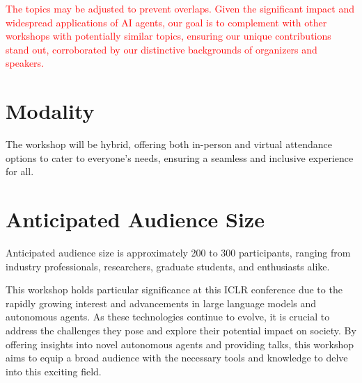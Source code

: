 \documentclass[10pt]{article} %
\begin{document}
\textcolor{red}{The topics may be adjusted to prevent overlaps. Given the significant impact and widespread applications of AI agents, our goal is to complement with other workshops with potentially similar topics, ensuring our unique contributions stand out, corroborated by our distinctive backgrounds of organizers and speakers.}

\section{Modality}
The workshop will be hybrid, offering both in-person and virtual attendance options to cater to everyone's needs, ensuring a seamless and inclusive experience for all.

\section{Anticipated Audience Size}
Anticipated audience size is approximately 200 to 300 participants, ranging from industry professionals, researchers, graduate students, and enthusiasts alike. 

This workshop holds particular significance at this ICLR conference due to the rapidly growing interest and advancements in large language models and autonomous agents. As these technologies continue to evolve, it is crucial to address the challenges they pose and explore their potential impact on society. By offering insights into novel autonomous agents and providing talks, this workshop aims to equip a broad audience with the necessary tools and knowledge to delve into this exciting field. 

\newpage
\end{document}
